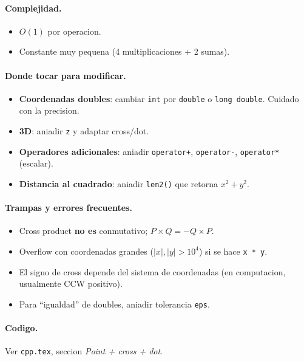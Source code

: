 \paragraph{Complejidad.}
\begin{itemize}\setlength\itemsep{0pt}
	\item $O(1)$ por operacion.
	\item Constante muy pequena (4 multiplicaciones + 2 sumas).
\end{itemize}

\paragraph{Donde tocar para modificar.}
\begin{itemize}\setlength\itemsep{0pt}
	\item \textbf{Coordenadas doubles}: cambiar \texttt{int} por \texttt{double} o \texttt{long double}. Cuidado con la precision.
	\item \textbf{3D}: aniadir \texttt{z} y adaptar cross/dot.
	\item \textbf{Operadores adicionales}: aniadir \texttt{operator+}, \texttt{operator-}, \texttt{operator*} (escalar).
	\item \textbf{Distancia al cuadrado}: aniadir \texttt{len2()} que retorna $x^2 + y^2$.
\end{itemize}

\paragraph{Trampas y errores frecuentes.}
\begin{itemize}\setlength\itemsep{0pt}
	\item Cross product \textbf{no es} conmutativo; $P \times Q = -Q \times P$.
	\item Overflow con coordenadas grandes ($|x|, |y| > 10^4$) si se hace \texttt{x * y}.
	\item El signo de cross depende del sistema de coordenadas (en computacion, usualmente CCW positivo).
	\item Para ``igualdad'' de doubles, aniadir tolerancia \texttt{eps}.
\end{itemize}

\paragraph{Codigo.}
Ver \texttt{cpp.tex}, seccion \textit{Point + cross + dot}.

\vspace{0.5em}
